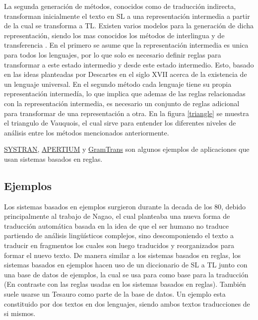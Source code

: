 \documentclass[12pt, letterpaper]{article}
\begin{document}
\begin{multicols}{2}
                La segunda generación de métodos, conocidos como de traducción indirecta, transforman inicialmente el texto
                en SL a una representación intermedia a partir de la cual se transforma a TL. Existen varios modelos para
                la generación de dicha representación, siendo los mas conocidos los métodos de interlingua y de transferencia 
                \cite{Musatafa}\cite{HUTCHINS1995431}\cite{Mohamed}. En el primero se asume que la representación intermedia es 
                unica para todos los lenguajes, por lo que solo es necesario definir reglas para transformar a este estado 
                intermedio y desde este estado intermedio. Esto, basado en las ideas planteadas por Descartes en el siglo XVII 
                acerca de la existencia de un lenguaje universal. En el segundo método cada lenguaje tiene su propia representación 
                intermedía, lo que implica que ademas de las reglas relacionadas con la representación intermedia, es necesario un 
                conjunto de reglas adicional para transformar de una representación a otra. En la figura \ref{triangle} se muestra el 
                triangulo de Vauquois, el cual sirve para entender los diferentes niveles de análisis entre los métodos mencionados 
                anteriormente. 
                
                
                \href{https://www.systransoft.com/} {SYSTRAN}, \href{https://www.apertium.org}{APERTIUM} y \href{https://gramtrans.com}{GramTrans}
                son algunos ejemplos de aplicaciones que usan sistemas basados en reglas.
                
                
            \subsection{Ejemplos}
                Los sistemas basados en ejemplos surgieron durante la decada de los 80, debido principalmente al trabajo de Nagao\cite{Nagao}, el cual planteaba
                una nueva forma de traducción automática basada en la idea de que el ser humano no traduce partiendo de análisis lingüísticos complejos, sino
                descomponiendo el texto a traducir en fragmentos los cuales son luego traducidos y reorganizados para formar el nuevo texto. De manera similar 
                a los sistemas basados en reglas, los sistemas basados en ejemplos hacen uso de un diccionario de SL a TL junto con una base de datos de ejemplos, 
                la cual se usa para como base para la traducción (En contraste con las reglas usadas en los sistemas basados en reglas). También suele usarse un 
                Tesauro como parte de la base de datos. Un ejemplo esta constituido por dos textos en dos lenguajes, siendo ambos textos traducciones de si mismos\cite{Haihua}.
                

\end{multicols}
\end{document}
